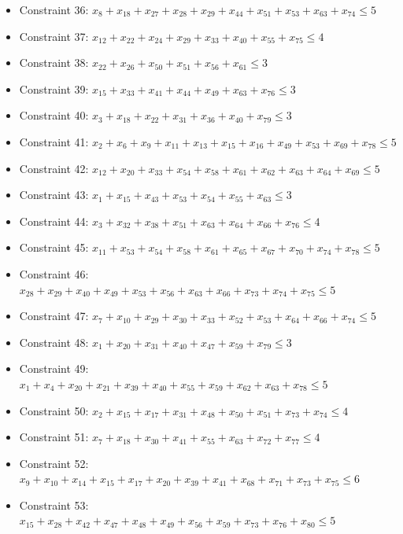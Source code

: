\documentclass[11pt]{article}
\begin{document}
\begin{itemize}
\item Constraint 36: $x_{8} + x_{18} + x_{27} + x_{28} + x_{29} + x_{44} + x_{51} + x_{53} + x_{63} + x_{74} \le 5$
\item Constraint 37: $x_{12} + x_{22} + x_{24} + x_{29} + x_{33} + x_{40} + x_{55} + x_{75} \le 4$
\item Constraint 38: $x_{22} + x_{26} + x_{50} + x_{51} + x_{56} + x_{61} \le 3$
\item Constraint 39: $x_{15} + x_{33} + x_{41} + x_{44} + x_{49} + x_{63} + x_{76} \le 3$
\item Constraint 40: $x_{3} + x_{18} + x_{22} + x_{31} + x_{36} + x_{40} + x_{79} \le 3$
\item Constraint 41: $x_{2} + x_{6} + x_{9} + x_{11} + x_{13} + x_{15} + x_{16} + x_{49} + x_{53} + x_{69} + x_{78} \le 5$
\item Constraint 42: $x_{12} + x_{20} + x_{33} + x_{54} + x_{58} + x_{61} + x_{62} + x_{63} + x_{64} + x_{69} \le 5$
\item Constraint 43: $x_{1} + x_{15} + x_{43} + x_{53} + x_{54} + x_{55} + x_{63} \le 3$
\item Constraint 44: $x_{3} + x_{32} + x_{38} + x_{51} + x_{63} + x_{64} + x_{66} + x_{76} \le 4$
\item Constraint 45: $x_{11} + x_{53} + x_{54} + x_{58} + x_{61} + x_{65} + x_{67} + x_{70} + x_{74} + x_{78} \le 5$
\item Constraint 46: $x_{28} + x_{29} + x_{40} + x_{49} + x_{53} + x_{56} + x_{63} + x_{66} + x_{73} + x_{74} + x_{75} \le 5$
\item Constraint 47: $x_{7} + x_{10} + x_{29} + x_{30} + x_{33} + x_{52} + x_{53} + x_{64} + x_{66} + x_{74} \le 5$
\item Constraint 48: $x_{1} + x_{20} + x_{31} + x_{40} + x_{47} + x_{59} + x_{79} \le 3$
\item Constraint 49: $x_{1} + x_{4} + x_{20} + x_{21} + x_{39} + x_{40} + x_{55} + x_{59} + x_{62} + x_{63} + x_{78} \le 5$
\item Constraint 50: $x_{2} + x_{15} + x_{17} + x_{31} + x_{48} + x_{50} + x_{51} + x_{73} + x_{74} \le 4$
\item Constraint 51: $x_{7} + x_{18} + x_{30} + x_{41} + x_{55} + x_{63} + x_{72} + x_{77} \le 4$
\item Constraint 52: $x_{9} + x_{10} + x_{14} + x_{15} + x_{17} + x_{20} + x_{39} + x_{41} + x_{68} + x_{71} + x_{73} + x_{75} \le 6$
\item Constraint 53: $x_{15} + x_{28} + x_{42} + x_{47} + x_{48} + x_{49} + x_{56} + x_{59} + x_{73} + x_{76} + x_{80} \le 5$

\end{itemize}
\end{document}
